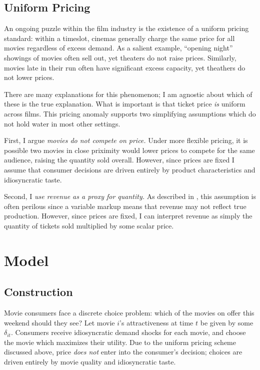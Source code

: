 \documentclass{article}
\begin{document}
\subsection{Uniform Pricing}

An ongoing puzzle within the film industry is the existence of a uniform pricing standard: within a timeslot, cinemas generally charge the same price for all movies regardless of excess demand. As a salient example, ``opening night'' showings of movies often sell out, yet theaters do not raise prices. Similarly, movies late in their run often have significant excess capacity, yet theathers do not lower prices.

There are many explanations for this phenomenon; I am agnostic about which of these is the true explanation. What is important is that ticket price \emph{is} uniform across films. This pricing anomaly supports two simplifying assumptions which do not hold water in most other settings.

First, I argue \emph{movies do not compete on price.} Under more flexible pricing, it is possible two movies in close priximity would lower prices to compete for the same audience, raising the quantity sold overall. However, since prices are fixed I assume that consumer decisions are driven entirely by product characteristics and idiosyncratic taste.

Second, I \emph{use revenue as a proxy for quantity.} As described in \textcite{bond2021JME}, this assumption is often perilous since a variable markup means that revenue may not reflect true production. However, since prices are fixed, I can interpret revenue as simply the quantity of tickets sold multiplied by some scalar price. 


\section{Model}

\subsection{Construction}

Movie consumers face a discrete choice problem: which of the movies on offer this weekend should they see? Let movie $i$'s attractiveness at time $t$ be given by some $\delta_{it}$. Consumers receive idiosyncratic demand shocks for each movie, and choose the movie which maximizes their utility. Due to the uniform pricing scheme discussed above, price \emph{does not} enter into the consumer's decision; choices are driven entirely by movie quality and idiosyncratic taste.
\end{document}
